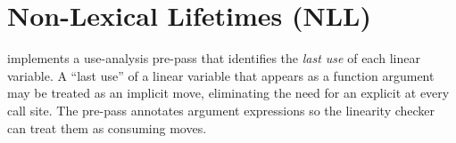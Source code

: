 \section{Non-Lexical Lifetimes (NLL)}
\label{sec:lin-nll}

\pnum
{} implements a use-analysis pre-pass that
identifies the \emph{last use} of each linear variable.  A ``last use'' of a
linear variable that appears as a function argument may be treated as an
implicit move, eliminating the need for an explicit  at every
call site.  The pre-pass annotates  argument expressions so
the linearity checker can treat them as consuming moves.
